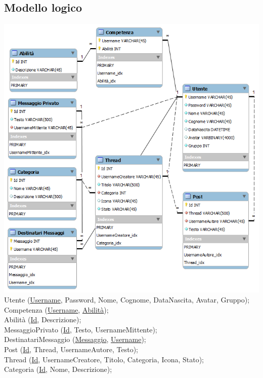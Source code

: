 \documentclass[a4paper,12pt]{article}
\begin{document}
\subsection{Modello logico}
\includegraphics[scale=0.75]{ERMSWB.png}
Utente (\underline{Username}, Password, Nome, Cognome, DataNascita, Avatar,  Gruppo);\\
Competenza (\underline{Username}, \underline{Abilità});\\
Abilità (\underline{Id}, Descrizione);\\
MessaggioPrivato (\underline{Id}, Testo, UsernameMittente);\\
DestinatariMessaggio (\underline{Messaggio}, \underline{Username});\\
Post (\underline{Id}, Thread, UsernameAutore, Testo);\\
Thread (\underline{Id}, UsernameCreatore, Titolo, Categoria, Icona, Stato);\\
Categoria (\underline{Id}, Nome, Descrizione);\\
\end{document}
